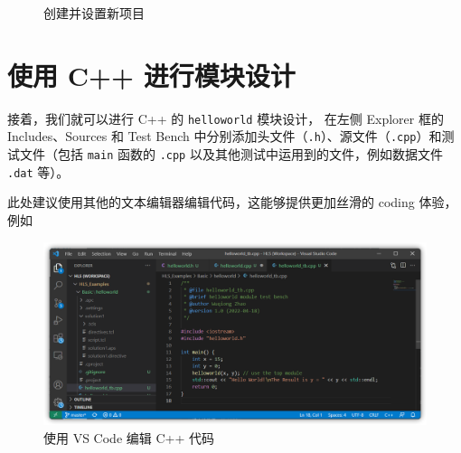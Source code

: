 \documentclass[English,Chinese,French,JP,TC,use boldface,simple name]{beaulivre}
\begin{document}
    \begin{figure}[h!]
      \centering
      \quad
      \caption{创建并设置新项目}
    \end{figure}

  \section{使用 C++ 进行模块设计}

    接着，我们就可以进行 C++ 的 \texttt{helloworld} 模块设计，
    在左侧 Explorer 框的 Includes、Sources 和 Test Bench 中分别添加头文件（\texttt{.h}）、源文件（\texttt{.cpp}）和测试文件（包括 \texttt{main} 函数的 \texttt{.cpp} 以及其他测试中运用到的文件，例如数据文件 \texttt{.dat} 等）。
    
    此处建议使用其他的文本编辑器编辑代码，这能够提供更加丝滑的 coding 体验，例如
    \begin{figure}[htbp]
      \centering
      \includegraphics[width=.8\linewidth]{win/helloworld/vscode_edit.png}
      \caption{使用 VS Code 编辑 C++ 代码}
    \end{figure}
\end{document}
